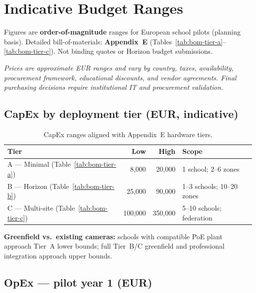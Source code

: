 \section{Indicative Budget Ranges}
\label{app:budget}
\label{sec:budget-ranges}

Figures are \textbf{order-of-magnitude} ranges for European school pilots (planning basis).
Detailed bill-of-materials: \textbf{Appendix~E} (Tables~\ref{tab:bom-tier-a}--\ref{tab:bom-tier-c}).
Not binding quotes or Horizon budget submissions.

\smallskip\noindent\textit{Prices are approximate EUR ranges and vary by country, taxes, availability,
procurement framework, educational discounts, and vendor agreements.
Final purchasing decisions require institutional IT and procurement validation.}

\subsection{CapEx by deployment tier (EUR, indicative)}

\begin{table}[htbp]
  \centering
  \caption{CapEx ranges aligned with Appendix~E hardware tiers.}
  \label{tab:capex-by-tier}
  \small
  \begin{tabular}{@{}lrrl@{}}
    \toprule
    Tier & Low & High & Scope \\
    \midrule
    A --- Minimal (Table~\ref{tab:bom-tier-a}) & 8{,}000 & 20{,}000 & 1 school; 2--6 zones \\
    B --- Horizon (Table~\ref{tab:bom-tier-b}) & 25{,}000 & 90{,}000 & 1--3 schools; 10--20 zones \\
    C --- Multi-site (Table~\ref{tab:bom-tier-c}) & 100{,}000 & 350{,}000 & 5--10 schools; federation \\
    \bottomrule
  \end{tabular}
\end{table}

\textbf{Greenfield vs.\ existing cameras:} schools with compatible PoE plant approach Tier~A lower
bounds; full Tier~B/C greenfield and professional integration approach upper bounds.

\subsection{OpEx --- pilot year 1 (EUR)}

